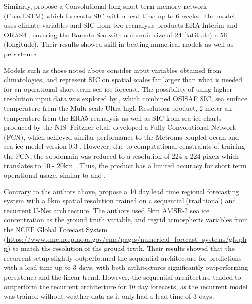 \documentclass[../main/thesis.tex]{subfiles}
\begin{document}
Similarly, \citet{Liu2021} propose a Convolutional long short-term memory network (ConvLSTM) which forecasts SIC with a lead time up to 6 weeks. The model uses climate variables and SIC from two reanalysis products ERA-Interim \citep{Dee2011} and ORAS4 \citep{Balmaseda2013}, covering the Barents Sea with a domain size of 24 (latitude) x 56 (longitude). Their results showed skill in beating numerical models as well as persistence. 

Models such as those noted above consider input variables obtained from climatologies, and represent SIC on spatial scales far larger than what is needed for an operational short-term sea ice forecast. The possibility of using higher resolution input data was explored by \citet{Fritzner2020}, which combined OSISAF SIC, sea surface temperature from the Multi-scale Ultra-high Resolution product, 2 meter air temperature from the ERA5 reanalysis as well as SIC from sea ice charts produced by the NIS. Fritzner et.al. developed a Fully Convolutional Network (FCN), which achieved similar performance to the Metroms coupled ocean and sea ice model version 0.3 \citep{Kristensen2017}. However, due to computational constraints of training the FCN, the subdomain was reduced to a resolution of 224 x 224 pixels which translates to 10 - 20km \citep{Fritzner2020}. Thus, the product has a limited accuracy for short term operational usage, similar to \citep{Andersson2021} and \citep{Liu2021}.

Contrary to the authors above, \citet{Grigoryev2022} propose a 10 day lead time regional forecasting system with a 5km spatial resolution trained on a sequential (traditional) and recurrent U-Net architecture. The authors used 5km AMSR-2 sea ice concentration as the ground truth variable, and regrid atmospheric variables from the NCEP Global Forecast System (\url{https://www.emc.ncep.noaa.gov/emc/pages/numerical_forecast_systems/gfs.php}) to match the resolution of the ground truth. Their results showed that the recurrent setup slightly outperformed the sequential architecture for predictions with a lead time up to 3 days, with both architectures significantly outperforming persistence and the linear trend. However, the sequential architecture tended to outperform the recurrent architecture for 10 day forecasts, as the recurrent model was trained without weather data as it only had a lead time of 3 days.
\end{document}
